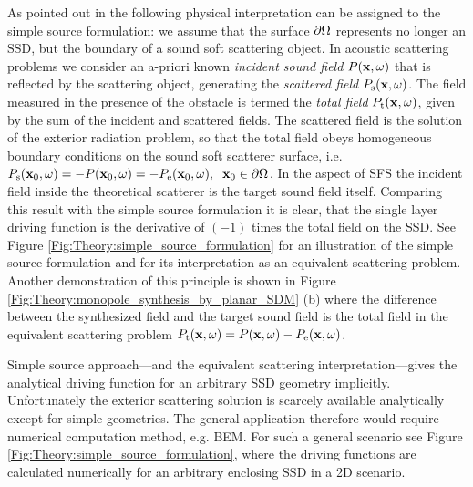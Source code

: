 \vspace{3mm}
As pointed out in \cite{Fazi2013:Equivalent_scattering, Fazi2010, Schultz2014:Comparing_approaches, Zotter2013:uniqueness} the following physical interpretation can be assigned to the simple source formulation: we assume that the surface $\partial \Omega$ represents no longer an SSD, but the boundary of a sound soft scattering object. In acoustic scattering problems we consider an a-priori known \emph{incident sound field} $P(\mathbf{x},\omega)$ that is reflected by the scattering object, generating the \emph{scattered field} $P_{\mathrm{s}}(\mathbf{x},\omega)$.
The field measured in the presence of the obstacle is termed the \emph{total field} $P_{\mathrm{t}}(\mathbf{x},\omega)$, given by the sum of the incident and scattered fields.
The scattered field is the solution of the exterior radiation problem, so that the total field obeys homogeneous boundary conditions on the sound soft scatterer surface, i.e. $P_{\mathrm{s}}(\mathbf{x}_0,\omega) = -P(\mathbf{x}_0,\omega) = - P_{\mathrm{e}}(\mathbf{x}_0,\omega), \hspace{.2cm} \mathbf{x}_0 \in \partial \Omega$.
In the aspect of SFS the incident field inside the theoretical scatterer is the target sound field itself.
Comparing this result with the simple source formulation it is clear, that the single layer driving function is the derivative of $(-1)$ times the total field on the SSD.
See Figure \ref{Fig:Theory:simple_source_formulation} for an illustration of the simple source formulation and for its interpretation as an equivalent scattering problem.
Another demonstration of this principle is shown in Figure \ref{Fig:Theory:monopole_synthesis_by_planar_SDM} (b) where the difference between the synthesized field and the target sound field is the total field in the equivalent scattering problem $P_{\mathrm{t}}(\mathbf{x},\omega) = P(\mathbf{x},\omega) - P_{\mathrm{e}}(\mathbf{x},\omega)$.

Simple source approach---and the equivalent scattering interpretation---gives the analytical driving function for an arbitrary SSD geometry implicitly. Unfortunately the exterior scattering solution is scarcely available analytically except for simple geometries. The general application therefore would require numerical computation method, e.g. BEM. For such a general scenario see Figure \ref{Fig:Theory:simple_source_formulation}, where the driving functions are calculated numerically for an arbitrary enclosing SSD in a 2D scenario.

